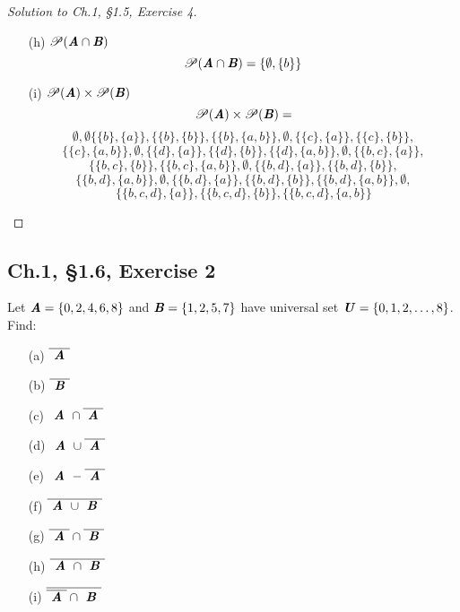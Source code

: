 \documentclass[12pt]{amsart}
\numberwithin{equation}{section}
\theoremstyle{definition}
\theoremstyle{remark}
\begin{document}
\begin{proof}[Solution to Ch.1, \S 1.5,  Exercise 4]
\begin{enumerate}
\item[(h)]
$ \mathscr{P}( \textbf{\textit{A}} \cap \textbf{\textit{B}} ) $
$$
\mathscr{P}( \textbf{\textit{A}} \cap \textbf{\textit{B}} ) = \{ \emptyset, \{ b \} \}
$$

\item[(i)]
$ \mathscr{P}( \textbf{\textit{A}} ) \times \mathscr{P}( \textbf{\textit{B}} ) $
$$
\mathscr{P}( \textbf{\textit{A}} ) \times \mathscr{P}( \textbf{\textit{B}} ) =
$$
$$
\emptyset, \emptyset \{ \{ b \}, \{ a \} \}, \{ \{ b \}, \{ b \} \}, \{ \{ b \}, \{ a, b \} \}, \emptyset, \{ \{ c \}, \{ a \} \}, \{ \{ c \}, \{ b \} \}, 
$$
$$
\{ \{ c \}, \{ a, b \} \}, \emptyset, \{ \{ d \}, \{ a \} \}, \{ \{ d \}, \{ b \} \}, \{ \{ d \}, \{ a, b \} \}, \emptyset, \{ \{ b, c \}, \{ a \} \}, 
$$
$$
\{ \{ b, c \}, \{ b \} \}, \{ \{ b, c \}, \{ a, b \} \}, \emptyset, \{ \{ b, d \}, \{ a \} \}, \{ \{ b, d \}, \{ b \} \},
$$
$$
\{ \{ b, d \}, \{ a, b \} \}, \emptyset, \{ \{ b, d \}, \{ a \} \}, \{ \{ b, d \}, \{ b \} \}, \{ \{ b, d \}, \{ a, b \} \}, \emptyset,
$$
$$
\{ \{ b, c, d \}, \{ a \} \}, \{ \{ b, c, d \}, \{ b \} \}, \{ \{ b, c, d \}, \{ a, b \} \} 
$$

\end{enumerate}

\end{proof}



\subsection*{Ch.1, \S 1.6,  Exercise 2} Let $ \textbf{\textit{A}} = \{ 0, 2, 4, 6, 8 \} $ and $ \textbf{\textit{B}} = \{ 1, 2, 5, 7 \} $ have universal set $ \textbf{\textit{U}} = \{ 0, 1, 2, \dots, 8 \} $. Find:

\begin{enumerate}
\item[(a)]
$ \overline{ \textbf{ \textit{A} } } $
\item[(b)]
$ \overline{ \textbf{ \textit{B} } } $
\item[(c)]
$ \textbf{ \textit{A} } \cap \overline{ \textbf{ \textit{A} } } $
\item[(d)]
$ \textbf{ \textit{A} } \cup \overline{ \textbf{ \textit{A} } } $
\item[(e)]
$ \textbf{ \textit{A} } - \overline{ \textbf{ \textit{A} } } $
\item[(f)]
$ \overline{ \textbf{ \textit{A} } \cup \textbf{ \textit{B} } } $
\item[(g)]
$ \overline{ \textbf{ \textit{A} } } \cap \overline{ \textbf{ \textit{B} } } $
\item[(h)]
$ \overline{ \textbf{ \textit{A} } \cap \textbf{ \textit{B} } } $
\item[(i)]
$ \overline{ \overline{ \textbf{ \textit{A} } } \cap \textbf{ \textit{B} } }
$

\end{enumerate}
\end{document}
